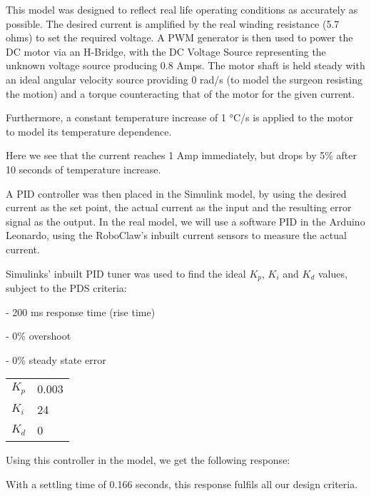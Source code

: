 

This model was designed to reflect real life operating conditions as
accurately as possible. The desired current is amplified by the real
winding resistance (5.7 ohms) to set the required voltage. A PWM
generator is then used to power the DC motor via an H-Bridge, with the
DC Voltage Source representing the unknown voltage source producing 0.8
Amps. The motor shaft is held steady with an ideal angular velocity
source providing 0 rad/s (to model the surgeon resisting the motion) and
a torque counteracting that of the motor for the given current.

Furthermore, a constant temperature increase of 1 °C/s is applied to the
motor to model its temperature dependence.


Here we see that the current reaches 1 Amp immediately, but drops by 5\%
after 10 seconds of temperature increase.

A PID controller was then placed in the Simulink model, by using the
desired current as the set point, the actual current as the input and
the resulting error signal as the output. In the real model, we will use
a software PID in the Arduino Leonardo, using the RoboClaw's inbuilt
current sensors to measure the actual current.


Simulinks' inbuilt PID tuner was used to find the ideal $K_p$, $K_i$ and
$K_d$ values, subject to the PDS criteria:

- 200 ms response time (rise time)

- 0\% overshoot

- 0\% steady state error

\begin{longtable}[]{@{}ll@{}}
  \toprule
  $K_p$ & 0.003\tabularnewline
  $K_i$ & 24\tabularnewline
  $K_d$ & 0\tabularnewline
  \bottomrule
\end{longtable}

Using this controller in the model, we get the following response:


With a settling time of 0.166 seconds, this response fulfils all our
design criteria.

